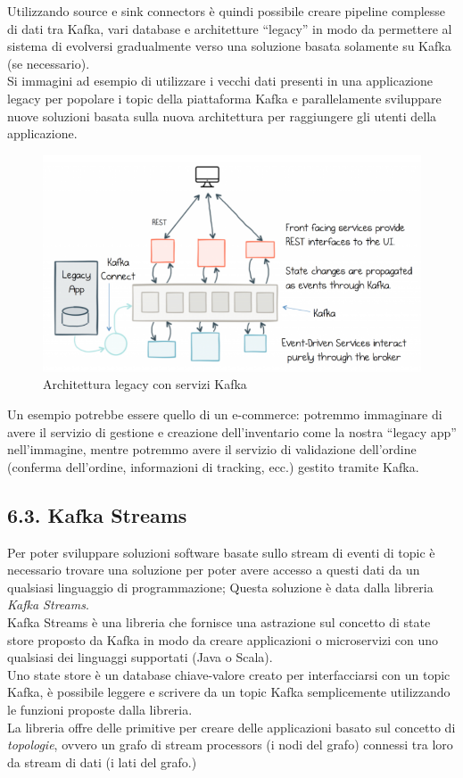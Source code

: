 \documentclass[]{article}
\begin{document}
\newpage

Utilizzando source e sink connectors è quindi possibile creare pipeline
complesse di dati tra Kafka, vari database e architetture ``legacy'' in
modo da permettere al sistema di evolversi gradualmente verso una
soluzione basata solamente su Kafka (se necessario).\\
Si immagini ad esempio di utilizzare i vecchi dati presenti in una
applicazione legacy per popolare i topic della piattaforma Kafka e
parallelamente sviluppare nuove soluzioni basata sulla nuova
architettura per raggiungere gli utenti della applicazione.

\begin{figure}
\centering
\includegraphics[width=1.05000\textwidth]{../images/legacy-kafka.png}
\caption{Architettura legacy con servizi Kafka \label{figure_5}}
\end{figure}

Un esempio potrebbe essere quello di un e-commerce: potremmo immaginare
di avere il servizio di gestione e creazione dell'inventario come la
nostra ``legacy app'' nell'immagine, mentre potremmo avere il servizio
di validazione dell'ordine (conferma dell'ordine, informazioni di
tracking, ecc.) gestito tramite Kafka.

\newpage

\subsection{6.3. Kafka Streams}\label{kafka-streams}

Per poter sviluppare soluzioni software basate sullo stream di eventi di
topic è necessario trovare una soluzione per poter avere accesso a
questi dati da un qualsiasi linguaggio di programmazione; Questa
soluzione è data dalla libreria \emph{Kafka Streams}.\\
Kafka Streams è una libreria che fornisce una astrazione sul concetto di
state store proposto da Kafka in modo da creare applicazioni o
microservizi con uno qualsiasi dei linguaggi supportati (Java o
Scala).\\
Uno state store è un database chiave-valore creato per interfacciarsi
con un topic Kafka, è possibile leggere e scrivere da un topic Kafka
semplicemente utilizzando le funzioni proposte dalla libreria.\\
La libreria offre delle primitive per creare delle applicazioni basato
sul concetto di \emph{topologie}, ovvero un grafo di stream processors
(i nodi del grafo) connessi tra loro da stream di dati (i lati del
grafo.)
\end{document}
